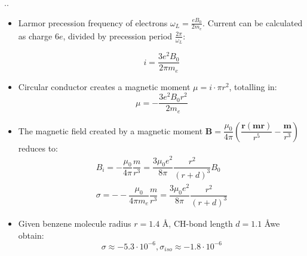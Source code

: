 \documentclass[handout]{beamer}
\begin{document}
\begin{frame}{\thesection.\thesubsection. \insertsubsection}
\begin{minipage}{0.3\textwidth}
			\end{minipage}
			\hspace{0.1cm}
			{\tiny
			\begin{minipage}{0.65\textwidth}
				\begin{itemize}[<+>]
					\item
									Larmor precession frequency of electrons $\omega_L = \frac{e B_0}{2 m_e}$. Current can be calculated as charge $6 e$, divided by precession period $\frac{2 \pi}{\omega_L}$:
									\par
									\begin{equation}				    
									i = \dfrac{3e^2 B_0}{2 \pi m_e}
									\end{equation}
					\item 
					Circular conductor creates a magnetic moment $\mu = i \cdot \pi r^2 $, totalling in:				
									\begin{equation}
									\mu = -\dfrac{3 e^2 B_0 r^2}{2 m_e}
									\end{equation}
					\item
									The magnetic field created by a magnetic moment  $\bm{B} = \dfrac{\mu_0}{4 \pi}(\dfrac{\bm{r(mr)}}{r^5} - \dfrac{\bm{m}}{r^3}  )$ reduces to:
									\begin{align}
									B_i = -\dfrac{\mu_0}{4 \pi}\dfrac{m}{r^3} = \dfrac{3 \mu_0 e^2}{8 \pi} \dfrac{r^2}{(r+d)^3} B_0 \\
									\sigma = --\dfrac{\mu_0}{4 \pi m_e}\dfrac{m}{r^3} = \dfrac{3 \mu_0 e^2}{8 \pi} \dfrac{r^2}{(r+d)^3}
									\end{align}
					\item
									Given benzene molecule radius $r=1.4$ \AA, CH-bond length $d = 1.1$ \AA we obtain:
									\begin{equation}
									\sigma \approx -5.3 \cdot 10^{-6}, \sigma_{iso} \approx -1.8 \cdot 10^{-6}
									\end{equation}
					
				\end{itemize}

			\end{minipage}
			
		    }%

		
		

\end{frame}
\end{document}
